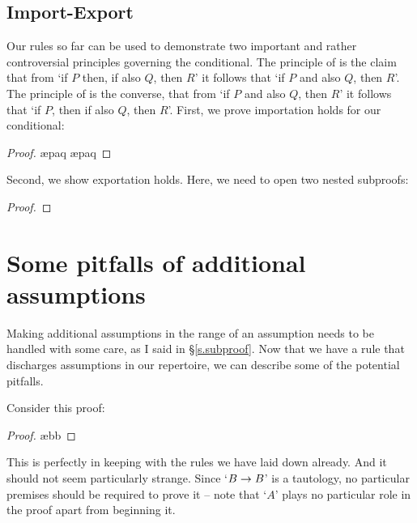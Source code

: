 \subsection{Import-Export}\label{import.export}
Our rules so far can be used to demonstrate two important and rather controversial principles governing the conditional. The principle of  is the claim that from `if $P$ then, if also $Q$, then $R$' it follows that `if $P$ and also $Q$, then $R$'. The principle of  is the converse, that from `if $P$ and also $Q$, then $R$' it follows that `if $P$, then if also $Q$, then $R$'. First, we prove importation holds for our conditional: \begin{proof}
	\open
	\ae{paq}
	\ae{paq}
	\close
\end{proof}
Second, we show exportation holds. Here, we need to open two nested subproofs:
\begin{proof}
	\open
	\open
	\close
	\close
\end{proof}


\section{Some pitfalls of additional assumptions}\label{pitfalls}


Making additional assumptions in the range of an assumption needs to be handled with some care, as I said in §\ref{s.subproof}. Now that we have a rule that discharges assumptions in our repertoire, we can describe some of the potential pitfalls.

Consider this proof:
\begin{proof}
	\open
		 \ae{bb}
	\close
\end{proof}
This is perfectly in keeping with the rules we have laid down already. And it should not seem particularly strange. Since `$B \rightarrow B$' is a tautology, no particular premises should be required to prove it – note that `$A$' plays no particular role in the proof apart from beginning it. 

